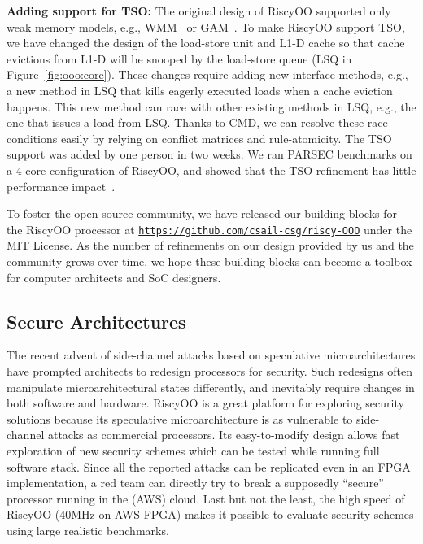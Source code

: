 \documentclass[conference]{IEEEtran}
\begin{document}
\noindent\textbf{Adding support for TSO:}
The original design of RiscyOO supported only weak memory models, e.g., WMM~\cite{wmm} or GAM~\cite{gam}.
To make RiscyOO support TSO, we have changed the design of the load-store unit and L1-D cache so that cache evictions from L1-D will be snooped by the load-store queue (LSQ in Figure~\ref{fig:ooo:core}).
These changes require adding new interface methods, e.g., a new method in LSQ that kills eagerly executed loads when a cache eviction happens.
This new method can race with other existing methods in LSQ, e.g., the one that issues a load from LSQ.
Thanks to CMD, we can resolve these race conditions easily by relying on conflict matrices and rule-atomicity.
The TSO support was added by one person in two weeks.
We ran PARSEC benchmarks on a 4-core configuration of RiscyOO, and showed that the TSO refinement has little performance impact~\cite{riscyoo}.

To foster the open-source community, we have released our building blocks for the RiscyOO processor at \texttt{\url{https://github.com/csail-csg/riscy-OOO}} under the MIT License.
As the number of refinements on our design provided by us and the community grows over time, we hope these building blocks can become a toolbox for computer architects and SoC designers.

\subsection{Secure Architectures}
The recent advent of side-channel attacks based on speculative microarchitectures have prompted architects to redesign processors for security.
Such redesigns often manipulate microarchitectural states differently, and inevitably require changes in both software and hardware.
RiscyOO is a great platform for exploring security solutions because its speculative microarchitecture is as vulnerable to side-channel attacks as commercial processors.
Its easy-to-modify design allows fast exploration of new security schemes which can be tested while running full software stack.
Since all the reported attacks can be replicated even in an FPGA implementation, a red team can directly try to break a supposedly ``secure'' processor running in the (AWS) cloud.
Last but not the least, the high speed of RiscyOO (40MHz on AWS FPGA) makes it possible to evaluate security schemes using large realistic benchmarks.
\end{document}
